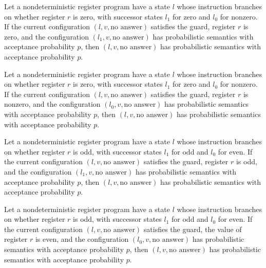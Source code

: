 \begin{lemma}
\label{Complexity.LogProg.PSem.jz_pos}
\leanok
{}
Let a nondeterministic register program have a state $l$ whose instruction branches on
whether register $r$ is zero, with successor states $l_1$ for zero and $l_0$ for
nonzero. If the current configuration $(l,v,\text{no answer})$ satisfies the guard,
register $r$ is zero, and the configuration $(l_1,v,\text{no answer})$ has probabilistic
semantics with acceptance probability $p$, then $(l,v,\text{no answer})$ has
probabilistic semantics with acceptance probability $p$.
\end{lemma}

\begin{lemma}
\label{Complexity.LogProg.PSem.jz_neg}
\leanok
{}
Let a nondeterministic register program have a state $l$ whose instruction branches on
whether register $r$ is zero, with successor states $l_1$ for zero and $l_0$ for
nonzero. If the current configuration $(l,v,\text{no answer})$ satisfies the guard,
register $r$ is nonzero, and the configuration $(l_0,v,\text{no answer})$ has
probabilistic semantics with acceptance probability $p$, then $(l,v,\text{no answer})$
has probabilistic semantics with acceptance probability $p$.
\end{lemma}

\begin{lemma}
\label{Complexity.LogProg.PSem.jodd_pos}
\leanok
{}
Let a nondeterministic register program have a state $l$ whose instruction branches on
whether register $r$ is odd, with successor states $l_1$ for odd and $l_0$ for even. If
the current configuration $(l,v,\text{no answer})$ satisfies the guard, register $r$ is
odd, and the configuration $(l_1,v,\text{no answer})$ has probabilistic semantics with
acceptance probability $p$, then $(l,v,\text{no answer})$ has probabilistic semantics
with acceptance probability $p$.
\end{lemma}

\begin{lemma}
\label{Complexity.LogProg.PSem.jodd_neg}
\leanok
{}
Let a nondeterministic register program have a state $l$ whose instruction branches on
whether register $r$ is odd, with successor states $l_1$ for odd and $l_0$ for even. If
the current configuration $(l,v,\text{no answer})$ satisfies the guard, the value of
register $r$ is even, and the configuration $(l_0,v,\text{no answer})$ has probabilistic
semantics with acceptance probability $p$, then $(l,v,\text{no answer})$ has
probabilistic semantics with acceptance probability $p$.
\end{lemma}

